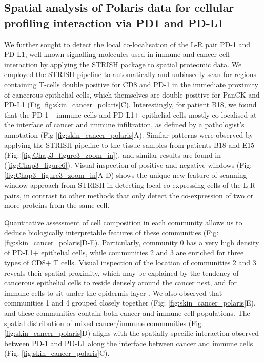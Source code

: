 \subsection{Spatial analysis of Polaris data for cellular profiling interaction via PD1 and PD-L1}
We further sought to detect the local co-localisation of the L-R pair PD-1 and PD-L1, well-known signalling molecules used in immune and cancer cell interaction \cite{pardoll2012blockade} by applying the STRISH package to spatial proteomic data.  We employed the STRISH pipeline to automatically and unbiasedly scan for regions containing T-cells double positive for CD8 and PD-1 in the immediate proximity of cancerous epithelial cells, which themselves are double positive for PanCK and PD-L1 (Fig \ref{fig:skin_cancer_polaris}C). Interestingly, for patient B18, we found that the PD-1+ immune cells and PD-L1+ epithelial cells mostly co-localised at the interface of cancer and immune infiltration, as defined by a pathologist’s annotation (Fig \ref{fig:skin_cancer_polaris}A). Similar patterns were observed by applying the STRISH pipeline to the tissue samples from patients B18 and E15 (Fig: \ref{fig:Chap3_figure3_zoom_in}), and similar results are found in (\ref{fig:Chap3_figure6}). Visual inspection of positive and negative windows (Fig: \ref{fig:Chap3_figure3_zoom_in}A-D) shows the unique new feature of scanning window approach from STRISH in detecting local co-expressing cells of the L-R pairs, in contrast to other methods that only detect the co-expression of two or more proteins from the same cell. 

Quantitative assessment of cell composition in each community allows us to deduce biologically interpretable features of these communities (Fig: \ref{fig:skin_cancer_polaris}D-E). Particularly, community 0 has a very high density of PD-L1+ epithelial cells, while communities 2 and 3 are enriched for three types of CD8+ T cells. Visual inspection of the location of communities 2 and 3 reveals their spatial proximity, which may be explained by the tendency of cancerous epithelial cells to reside densely around the cancer nest, and for immune cells to sit under the epidermis layer \cite{herrscher2020immune}. We also observed that communities 1 and 4 grouped closely together (Fig: \ref{fig:skin_cancer_polaris}E), and these communities contain both cancer and immune cell populations. The spatial distribution of mixed cancer/immune communities (Fig \ref{fig:skin_cancer_polaris}D) aligns with the spatially-specific interaction observed between PD-1 and PD-L1 along the interface between cancer and immune cells (Fig: \ref{fig:skin_cancer_polaris}C).

